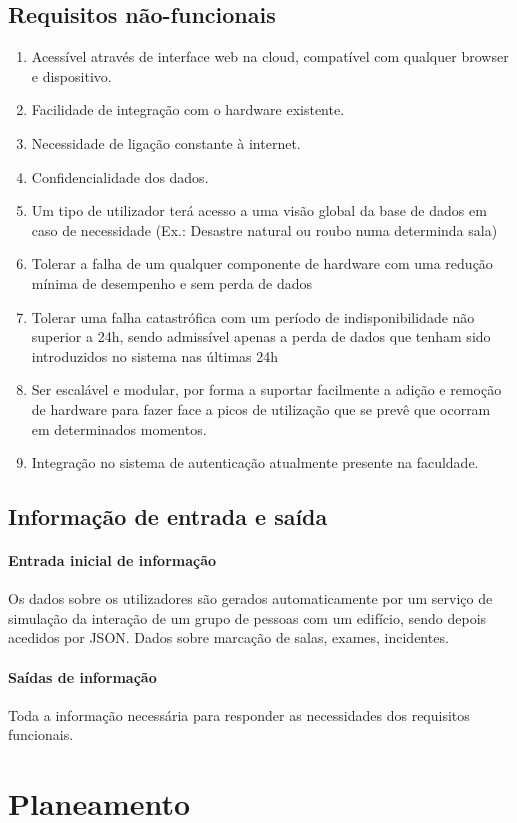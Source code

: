 \documentclass[a4paper]{report}
\begin{document}
\section{Requisitos não-funcionais}
\begin{enumerate}
\item Acessível através de interface web na cloud, compatível com qualquer browser e dispositivo.
\item Facilidade de integração com o hardware existente.
\item Necessidade de ligação constante à internet.
\item Confidencialidade dos dados.
\item Um tipo de utilizador terá acesso a uma visão global da base de dados em caso de necessidade (Ex.: Desastre natural ou roubo numa determinda sala)
\item Tolerar a falha de um qualquer componente de hardware com uma redução mínima de desempenho e sem perda de dados
\item Tolerar uma falha catastrófica com um período de indisponibilidade não superior a 24h, sendo admissível apenas a perda de dados que tenham sido introduzidos no sistema nas últimas 24h
\item Ser escalável e modular, por forma a suportar facilmente a adição e remoção de hardware para fazer face a picos de utilização que se prevê que ocorram em determinados momentos.
\item Integração no sistema de autenticação atualmente presente na faculdade.
\end{enumerate}
\section{Informação de entrada e saída}
\subsubsection*{Entrada inicial de informação}
    Os dados sobre os utilizadores são gerados automaticamente por um serviço de simulação da interação de um grupo de pessoas com um edifício, sendo depois acedidos por JSON.
    Dados sobre marcação de salas, exames, incidentes.
\subsubsection*{Saídas de informação}
    Toda a informação necessária para responder as necessidades dos requisitos funcionais.
\chapter{Planeamento}
\end{document}
